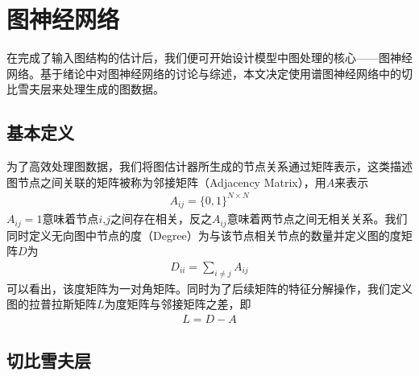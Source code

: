 \section{图神经网络}
在完成了输入图结构的估计后，我们便可开始设计模型中图处理的核心——图神经网络。基于绪论中对图神经网络的讨论与综述，本文决定使用谱图神经网络中的切比雪夫层来处理生成的图数据。

\subsection{基本定义}

为了高效处理图数据，我们将图估计器所生成的节点关系通过矩阵表示，这类描述图节点之间关联的矩阵被称为邻接矩阵（Adjacency Matrix），用$A$来表示
\begin{equation}\begin{aligned}
A_{ij}=\{0,1\}^{N\times N}
\end{aligned}\end{equation}
$A_{ij}=1$意味着节点$i$,$j$之间存在相关，反之$A_{ij}$意味着两节点之间无相关关系。我们同时定义无向图中节点的度（Degree）为与该节点相关节点的数量并定义图的度矩阵$D$为
\begin{equation}\begin{aligned}
D_{ii}=\sum_{i\neq j}A_{ij}
\end{aligned}\end{equation}
可以看出，该度矩阵为一对角矩阵。同时为了后续矩阵的特征分解操作，我们定义图的拉普拉斯矩阵$L$为度矩阵与邻接矩阵之差，即
\begin{equation}\begin{aligned}
L=D-A
\end{aligned}\end{equation}
\subsection{切比雪夫层}

